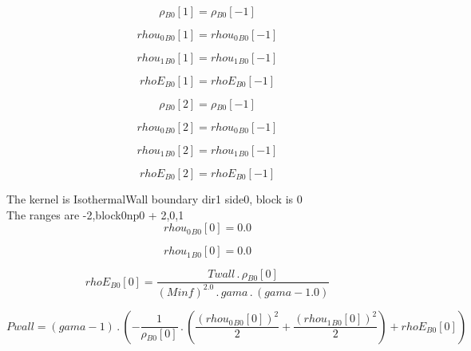 \documentclass{article}
\begin{document}
\begin{dmath}{\rho{_{B0}}}[{1}] = {\rho{_{B0}}}[{-1}]\end{dmath}

\begin{dmath}{rhou_{0}{_{B0}}}[{1}] = {rhou_{0}{_{B0}}}[{-1}]\end{dmath}

\begin{dmath}{rhou_{1}{_{B0}}}[{1}] = {rhou_{1}{_{B0}}}[{-1}]\end{dmath}

\begin{dmath}{rhoE{_{B0}}}[{1}] = {rhoE{_{B0}}}[{-1}]\end{dmath}

\begin{dmath}{\rho{_{B0}}}[{2}] = {\rho{_{B0}}}[{-1}]\end{dmath}

\begin{dmath}{rhou_{0}{_{B0}}}[{2}] = {rhou_{0}{_{B0}}}[{-1}]\end{dmath}

\begin{dmath}{rhou_{1}{_{B0}}}[{2}] = {rhou_{1}{_{B0}}}[{-1}]\end{dmath}

\begin{dmath}{rhoE{_{B0}}}[{2}] = {rhoE{_{B0}}}[{-1}]\end{dmath}

\noindent The kernel is IsothermalWall boundary dir1 side0, block is 0\\\noindent The ranges are -2,block0np0 + 2,0,1\\\begin{dmath}{rhou_{0}{_{B0}}}[{0}] = 0.0\end{dmath}

\begin{dmath}{rhou_{1}{_{B0}}}[{0}] = 0.0\end{dmath}

\begin{dmath}{rhoE{_{B0}}}[{0}] = \frac{Twall \,.\, {\rho{_{B0}}}[{0}]}{\left(Minf \right)^{2.0} \,.\, gama \,.\, \left(gama - 1.0\right)}\end{dmath}

\begin{dmath}Pwall = \left(gama - 1\right) \,.\, \left(- \frac{1}{{\rho{_{B0}}}[{0}]} \,.\, \left(\frac{\left({rhou_{0}{_{B0}}}[{0}] \right)^{2}}{2} + \frac{\left({rhou_{1}{_{B0}}}[{0}] \right)^{2}}{2}\right) + {rhoE{_{B0}}}[{0}]\right)\end{dmath}
\end{document}

